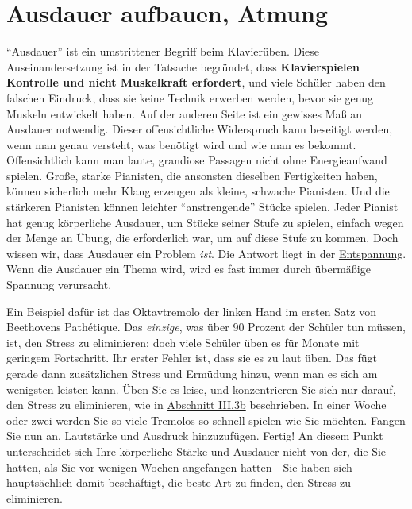 
\section{Ausdauer aufbauen, Atmung}\hypertarget{c1ii21}{}

\enquote{Ausdauer} ist ein umstrittener Begriff beim Klavierüben.
Diese Auseinandersetzung ist in der Tatsache begründet, dass \textbf{Klavierspielen Kontrolle und nicht Muskelkraft erfordert}, und viele Schüler haben den falschen Eindruck, dass sie keine Technik erwerben werden, bevor sie genug Muskeln entwickelt haben.
Auf der anderen Seite ist ein gewisses Maß an Ausdauer notwendig.
Dieser offensichtliche Widerspruch kann beseitigt werden, wenn man genau versteht, was benötigt wird und wie man es bekommt.
Offensichtlich kann man laute, grandiose Passagen nicht ohne Energieaufwand spielen.
Große, starke Pianisten, die ansonsten dieselben Fertigkeiten haben, können sicherlich mehr Klang erzeugen als kleine, schwache Pianisten.
Und die stärkeren Pianisten können leichter \enquote{anstrengende} Stücke spielen.
Jeder Pianist hat genug körperliche Ausdauer, um Stücke seiner Stufe zu spielen, einfach wegen der Menge an Übung, die erforderlich war, um auf diese Stufe zu kommen.
Doch wissen wir, dass Ausdauer ein Problem \textit{ist}.
Die Antwort liegt in der \hyperlink{c1ii14}{Entspannung}.
Wenn die Ausdauer ein Thema wird, wird es fast immer durch übermäßige Spannung verursacht.

Ein Beispiel dafür ist das Oktavtremolo der linken Hand im ersten Satz von Beethovens Pathétique.
Das \textit{einzige}, was über 90 Prozent der Schüler tun müssen, ist, den Stress zu eliminieren; doch viele Schüler üben es für Monate mit geringem Fortschritt.
Ihr erster Fehler ist, dass sie es zu laut üben.
Das fügt gerade dann zusätzlichen Stress und Ermüdung hinzu, wenn man es sich am wenigsten leisten kann.
Üben Sie es leise, und konzentrieren Sie sich nur darauf, den Stress zu eliminieren, wie in \hyperlink{c1iii3b}{Abschnitt III.3b} beschrieben.
In einer Woche oder zwei werden Sie so viele Tremolos so schnell spielen wie Sie möchten.
Fangen Sie nun an, Lautstärke und Ausdruck hinzuzufügen. Fertig!
An diesem Punkt unterscheidet sich Ihre körperliche Stärke und Ausdauer nicht von der, die Sie hatten, als Sie vor wenigen Wochen angefangen hatten - Sie haben sich hauptsächlich damit beschäftigt, die beste Art zu finden, den Stress zu eliminieren.


